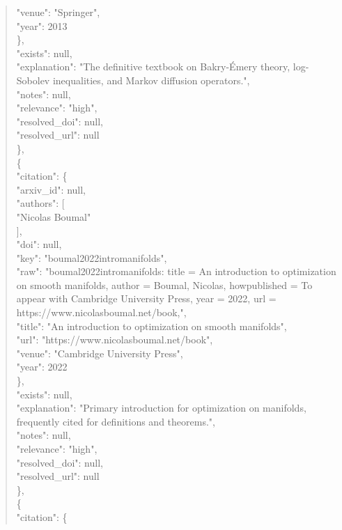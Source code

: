 \documentclass[11pt]{article}
\begin{document}
\begin{quote}
        "venue": "Springer",\\
        "year": 2013\\
      \},\\
      "exists": null,\\
      "explanation": "The definitive textbook on Bakry-Émery theory, log-Sobolev inequalities, and Markov diffusion operators.",\\
      "notes": null,\\
      "relevance": "high",\\
      "resolved\_doi": null,\\
      "resolved\_url": null\\
    \},\\
    \{\\
      "citation": \{\\
        "arxiv\_id": null,\\
        "authors": [\\
          "Nicolas Boumal"\\
        ],\\
        "doi": null,\\
        "key": "boumal2022intromanifolds",\\
        "raw": "boumal2022intromanifolds: title = An introduction to optimization on smooth manifolds, author = Boumal, Nicolas, howpublished = To appear with Cambridge University Press, year = 2022, url = https://www.nicolasboumal.net/book,",\\
        "title": "An introduction to optimization on smooth manifolds",\\
        "url": "https://www.nicolasboumal.net/book",\\
        "venue": "Cambridge University Press",\\
        "year": 2022\\
      \},\\
      "exists": null,\\
      "explanation": "Primary introduction for optimization on manifolds, frequently cited for definitions and theorems.",\\
      "notes": null,\\
      "relevance": "high",\\
      "resolved\_doi": null,\\
      "resolved\_url": null\\
    \},\\
    \{\\
      "citation": \{\\

\end{quote}
\end{document}
